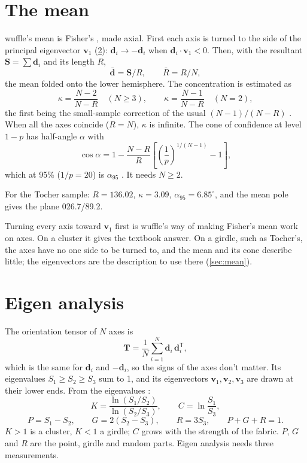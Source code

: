 \section{The mean}\label{sec:m-mean}

wuffle's mean is Fisher's \parencite{fisher1953}, made axial. First each axis is turned to the side of the
principal eigenvector $\mathbf{v}_1$ (\cref{sec:m-eigen}): $\mathbf{d}_i \to -\mathbf{d}_i$ when
$\mathbf{d}_i \cdot \mathbf{v}_1 < 0$. Then, with the resultant $\mathbf{S} = \sum \mathbf{d}_i$ and its
length $R$,
\[ \bar{\mathbf{d}} = \mathbf{S}/R, \qquad \bar{R} = R/N, \]
the mean folded onto the lower hemisphere. The concentration is estimated as
\[ \kappa = \frac{N - 2}{N - R} \quad (N \ge 3), \qquad \kappa = \frac{N - 1}{N - R} \quad (N = 2), \]
the first being the small-sample correction of the usual $(N-1)/(N-R)$ \parencite{fisher1987}. When all the
axes coincide ($R = N$), $\kappa$ is infinite. The cone of confidence at level $1 - p$ has half-angle
$\alpha$ with
\[ \cos\alpha = 1 - \frac{N - R}{R}\left[\left(\frac{1}{p}\right)^{1/(N-1)} - 1\right], \]
which at 95\% ($1/p = 20$) is $\alpha_{95}$ \parencite{fisher1953}. It needs $N \ge 2$.

For the Tocher sample: $R = 136.02$, $\kappa = 3.09$, $\alpha_{95} = 6.85^\circ$, and the mean pole gives
the plane 026.7/89.2.

\begin{note}
Turning every axis toward $\mathbf{v}_1$ first is wuffle's way of making Fisher's mean work on axes. On a
cluster it gives the textbook answer. On a girdle, such as Tocher's, the axes have no one side to be
turned to, and the mean and its cone describe little; the eigenvectors are the description to use there
(\cref{sec:mean}).
\end{note}

\section{Eigen analysis}\label{sec:m-eigen}

The orientation tensor of $N$ axes is
\[ \mathbf{T} = \frac{1}{N}\sum_{i=1}^{N} \mathbf{d}_i\,\mathbf{d}_i^{\mathsf{T}}, \]
which is the same for $\mathbf{d}_i$ and $-\mathbf{d}_i$, so the signs of the axes don't matter. Its
eigenvalues $S_1 \ge S_2 \ge S_3$ sum to 1, and its eigenvectors $\mathbf{v}_1, \mathbf{v}_2,
\mathbf{v}_3$ are drawn at their lower ends. From the eigenvalues \parencite{woodcock1977,vollmer1990}:
\[ K = \frac{\ln(S_1/S_2)}{\ln(S_2/S_3)}, \qquad C = \ln\frac{S_1}{S_3}, \]
\[ P = S_1 - S_2, \qquad G = 2(S_2 - S_3), \qquad R = 3S_3, \qquad P + G + R = 1. \]
$K > 1$ is a cluster, $K < 1$ a girdle; $C$ grows with the strength of the fabric. $P$, $G$ and $R$ are
the point, girdle and random parts. Eigen analysis needs three measurements.

